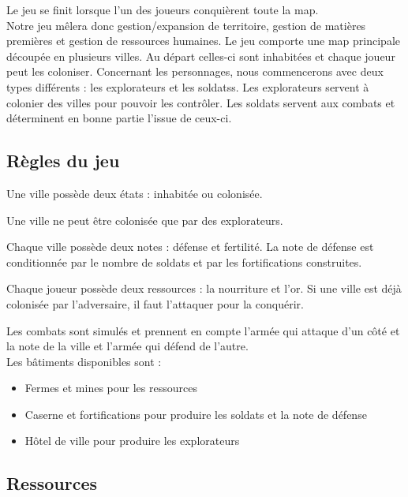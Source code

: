 \documentclass[a4paper,12pt]{article}
\begin{document}
Le jeu se finit lorsque l'un des joueurs conquièrent toute la map.
\\

Notre jeu mêlera donc gestion/expansion de territoire, gestion de matières premières et gestion de ressources humaines.
Le jeu comporte une map principale découpée en plusieurs villes. Au départ celles-ci sont inhabitées et chaque joueur peut les coloniser. Concernant les personnages, nous commencerons avec deux types différents : les explorateurs et les soldatss. Les explorateurs servent à colonier des villes pour pouvoir les contrôler. Les soldats servent aux combats et déterminent en bonne partie l'issue de ceux-ci.


\subsection{Règles du jeu}

\vspace{1\baselineskip}


Une ville possède deux états : inhabitée ou colonisée. 

Une ville ne peut être colonisée que par des explorateurs.

Chaque ville possède deux notes : défense et fertilité. La note de défense est conditionnée par le nombre de soldats et par les fortifications construites. 

Chaque joueur possède deux ressources : la nourriture et l'or.
Si une ville est déjà colonisée par l'adversaire, il faut l'attaquer pour la conquérir.

Les combats sont simulés et prennent en compte l'armée qui attaque d'un côté et la note de la ville et l'armée qui défend de l'autre.
\\

Les bâtiments disponibles sont : \begin{itemize}

\item Fermes et mines pour les ressources

\item Caserne et fortifications pour produire les soldats et la note de défense

\item Hôtel de ville pour produire les explorateurs

\end{itemize}


\subsection{Ressources}
\end{document}
